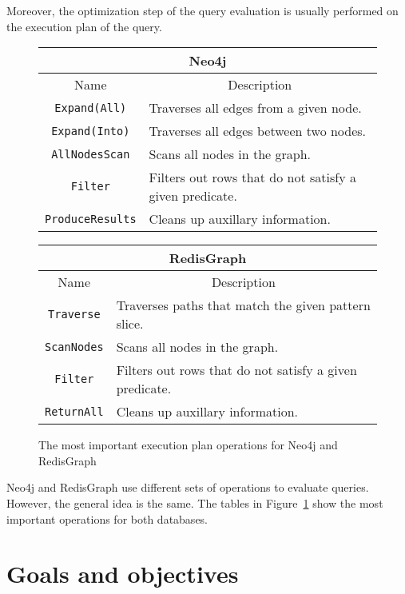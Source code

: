 \documentclass[14pt]{constructor-thesis}
\theoremstyle{definition}
\begin{document}
Moreover, the optimization step of the query evaluation is usually performed on the execution plan of the query.

\begin{figure}[t]
  \centering
  
  \begin{tabular}{ |c|l|  }
    \hline
    \multicolumn{2}{|c|}{Neo4j} \\
    \hline
    Name & \multicolumn{1}{c|}{Description} \\
    \hline
    \texttt{Expand(All)} & Traverses all edges from a given node. \\
    \texttt{Expand(Into)} & Traverses all edges between two nodes. \\
    \texttt{AllNodesScan} & Scans all nodes in the graph. \\
    \texttt{Filter} & Filters out rows that do not satisfy a given predicate. \\
    \texttt{ProduceResults} & Cleans up auxillary information. \\
    \hline
  \end{tabular}
  \begin{tabular}{ |c|l|  }
    \hline
    \multicolumn{2}{|c|}{RedisGraph} \\
    \hline
    Name & \multicolumn{1}{c|}{Description} \\
    \hline
    \texttt{Traverse} & Traverses paths that match the given pattern slice. \\
    \texttt{ScanNodes} & Scans all nodes in the graph. \\
    \texttt{Filter} & Filters out rows that do not satisfy a given predicate. \\
    \texttt{ReturnAll} & Cleans up auxillary information. \\
    \hline
  \end{tabular}

  \caption{The most important execution plan operations for Neo4j and RedisGraph}
  \label{fig:execution-plan-operations-summary}
\end{figure}

Neo4j and RedisGraph use different sets of operations to evaluate queries. However, the general idea is the same. The tables in Figure~\ref{fig:execution-plan-operations-summary} show the most important operations for both databases.

\section{Goals and objectives}
\end{document}
